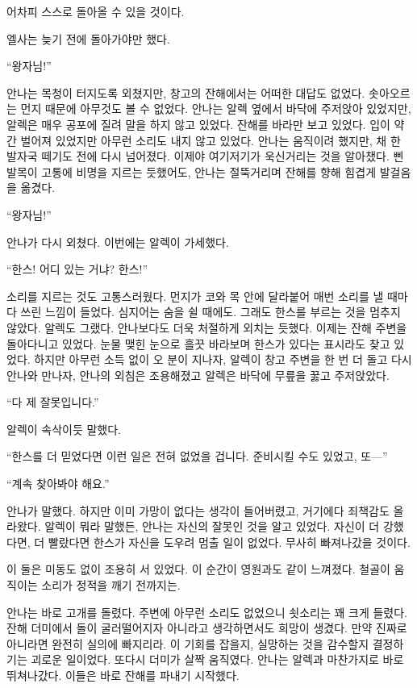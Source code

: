 어차피 스스로 돌아올 수 있을 것이다.

엘사는 늦기 전에 돌아가야만 했다.

\textbreak

\forceindent``왕자님!''

안나는 목청이 터지도록 외쳤지만, 창고의 잔해에서는 어떠한 대답도 없었다. 솟아오르는 먼지 때문에 아무것도 볼 수 없었다. 안나는 알렉 옆에서 바닥에 주저앉아 있었지만, 알렉은 매우 공포에 질려 말을 하지 않고 있었다. 잔해를 바라만 보고 있었다. 입이 약간 벌어져 있었지만 아무런 소리도 내지 않고 있었다. 안나는 움직이려 했지만, 채 한 발자국 떼기도 전에 다시 넘어졌다. 이제야 여기저기가 욱신거리는 것을 알아챘다. 삔 발목이 고통에 비명을 지르는 듯했어도, 안나는 절뚝거리며 잔해를 향해 힘겹게 발걸음을 옮겼다.

``왕자님!''

안나가 다시 외쳤다. 이번에는 알렉이 가세했다.

``한스! 어디 있는 거냐? 한스!''

소리를 지르는 것도 고통스러웠다. 먼지가 코와 목 안에 달라붙어 매번 소리를 낼 때마다 쓰린 느낌이 들었다. 심지어는 숨을 쉴 때에도. 그래도 한스를 부르는 것을 멈추지 않았다. 알렉도 그랬다. 안나보다도 더욱 처절하게 외치는 듯했다. 이제는 잔해 주변을 돌아다니고 있었다. 눈물 맺힌 눈으로 흘끗 바라보며 한스가 있다는 표시라도 찾고 있었다. 하지만 아무런 소득 없이 오 분이 지나자, 알렉이 창고 주변을 한 번 더 돌고 다시 안나와 만나자, 안나의 외침은 조용해졌고 알렉은 바닥에 무릎을 꿇고 주저앉았다.

``다 제 잘못입니다.''

알렉이 속삭이듯 말했다.

``한스를 더 믿었다면 이런 일은 전혀 없었을 겁니다. 준비시킬 수도 있었고, 또—''

``계속 찾아봐야 해요.''

안나가 말했다. 하지만 이미 가망이 없다는 생각이 들어버렸고, 거기에다 죄책감도 올라왔다. 알렉이 뭐라 말했든, 안나는 자신의 잘못인 것을 알고 있었다. 자신이 더 강했다면, 더 빨랐다면 한스가 자신을 도우려 멈출 일이 없었다. 무사히 빠져나갔을 것이다.

이 둘은 미동도 없이 조용히 서 있었다. 이 순간이 영원과도 같이 느껴졌다. 철골이 움직이는 소리가 정적을 깨기 전까지는.

안나는 바로 고개를 돌렸다. 주변에 아무런 소리도 없었으니 쇳소리는 꽤 크게 들렸다. 잔해 더미에서 돌이 굴러떨어지자 아니라고 생각하면서도 희망이 생겼다. 만약 진짜로 아니라면 완전히 실의에 빠지리라. 이 기회를 잡을지, 실망하는 것을 감수할지 결정하기는 괴로운 일이었다. 또다시 더미가 살짝 움직였다. 안나는 알렉과 마찬가지로 바로 뛰쳐나갔다. 이들은 바로 잔해를 파내기 시작했다.

